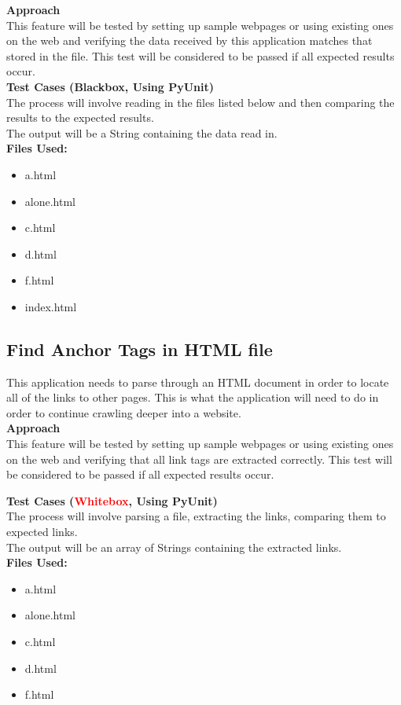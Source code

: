 \documentclass[12pt, titlepage]{article}
\begin{document}
\textbf{Approach}\\
This feature will be tested by setting up sample webpages or using existing ones on the web and verifying the data received by this application matches that stored in the file. This test will be considered to be passed if all expected results occur.\\

\textbf{Test Cases (Blackbox, Using PyUnit)}\\
The process will involve reading in the files listed below and then comparing the results to the expected results.\\
The output will be a String containing the data read in.\\

\textbf{Files Used:}
\begin{itemize}
\item a.html
\item alone.html
\item c.html
\item d.html
\item f.html
\item index.html
\end{itemize}

\subsection{Find Anchor Tags in HTML file}
This application needs to parse through an HTML document in order to locate all of the links to other pages. This is what the application will need to do in order to continue crawling deeper into a website.\\

\textbf{Approach}\\
This feature will be tested by setting up sample webpages or using existing ones on the web and verifying that all link tags are extracted correctly. This test will be considered to be passed if all expected results occur.

\textbf{Test Cases (\textcolor{red}{Whitebox}, Using PyUnit)}\\
The process will involve parsing a file, extracting the links, comparing them to expected links.\\
The output will be an array of Strings containing the extracted links.\\

\textbf{Files Used:}
\begin{itemize}
\item a.html
\item alone.html
\item c.html
\item d.html
\item f.html
\end{itemize}
\end{document}
